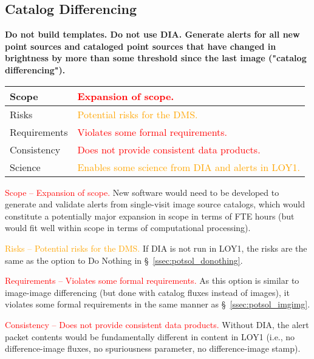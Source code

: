 \documentclass[DM,lsstdraft,toc]{lsstdoc}
\begin{document}
\clearpage
\subsection{Catalog Differencing}\label{ssec:potsol_catdiff}

{\bf Do not build templates. Do not use DIA. Generate alerts for all new point sources and cataloged point sources that have changed in brightness by more than some threshold since the last image ("catalog differencing").}

\begin{center}
\begin{tabular}{|p{2.5cm}|p{13cm}|}
\hline
Scope & \textcolor{red}{Expansion of scope.}  \\
\hline
Risks & \textcolor{orange}{Potential risks for the DMS.} \\
\hline
Requirements & \textcolor{red}{Violates some formal requirements.} \\
\hline
Consistency & \textcolor{red}{Does not provide consistent data products.} \\
\hline
Science & \textcolor{orange}{Enables some science from DIA and alerts in LOY1.} \\
\hline
\end{tabular}
\end{center}

\textcolor{red}{Scope -- Expansion of scope.}
New software would need to be developed to generate and validate alerts from single-visit image source catalogs, which would constitute a potentially major expansion in scope in terms of FTE hours (but would fit well within scope in terms of computational processing).

\textcolor{orange}{Risks -- Potential risks for the DMS.}
If DIA is not run in LOY1, the risks are the same as the option to Do Nothing in \S~\ref{ssec:potsol_donothing}. 

\textcolor{red}{Requirements -- Violates some formal requirements.}
As this option is similar to image-image differencing (but done with catalog fluxes instead of images), it violates some formal requirements in the same manner as \S~\ref{ssec:potsol_imgimg}. 

\textcolor{red}{Consistency -- Does not provide consistent data products.}
Without DIA, the alert packet contents would be fundamentally different in content in LOY1 (i.e., no difference-image fluxes, no spuriousness parameter, no difference-image stamp).
\end{document}
